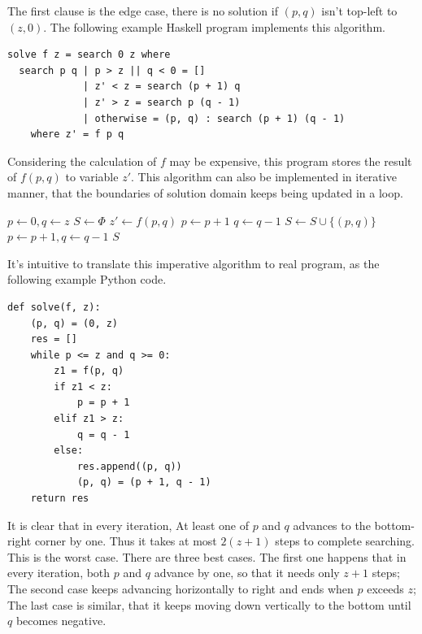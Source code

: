 \documentclass[UTF8]{article}
\begin{document}
The first clause is the edge case, there is no solution if $(p, q)$ isn't top-left to $(z, 0)$. The following
example Haskell program implements this algorithm.

\lstset{language=Haskell}
\begin{lstlisting}
solve f z = search 0 z where
  search p q | p > z || q < 0 = []
             | z' < z = search (p + 1) q
             | z' > z = search p (q - 1)
             | otherwise = (p, q) : search (p + 1) (q - 1)
    where z' = f p q
\end{lstlisting}

Considering the calculation of $f$ may be expensive, this program stores the result of $f(p, q)$ to variable $z'$.
This algorithm can also be implemented in iterative manner, that the boundaries of solution domain keeps being updated
in a loop.

\begin{algorithmic}[1]
  \State $p \gets 0, q \gets z$
  \State $S \gets \Phi$
    \State $z' \gets f(p, q)$
      \State $p \gets p + 1$
      \State $q \gets q - 1$
    \Else
      \State $S \gets S \cup \{(p, q)\}$
      \State $p \gets p + 1, q \gets q - 1$
    \EndIf
  \EndWhile
  \State \Return $S$
\EndFunction
\end{algorithmic}

It's intuitive to translate this imperative algorithm to real program, as the following example Python code.

\lstset{language=Python}
\begin{lstlisting}
def solve(f, z):
    (p, q) = (0, z)
    res = []
    while p <= z and q >= 0:
        z1 = f(p, q)
        if z1 < z:
            p = p + 1
        elif z1 > z:
            q = q - 1
        else:
            res.append((p, q))
            (p, q) = (p + 1, q - 1)
    return res

\end{lstlisting}

It is clear that in every iteration, At least one of $p$ and $q$ advances to the bottom-right corner by one.
Thus it takes at most $2(z+1)$ steps to complete searching. This is the worst case. There are three best
cases. The first one happens that in every iteration, both $p$ and $q$ advance by one, so that it needs
only $z+1$ steps; The second case keeps advancing horizontally to right and ends when $p$ exceeds $z$;
The last case is similar, that it keeps moving down vertically to the bottom until $q$ becomes negative.
\end{document}
